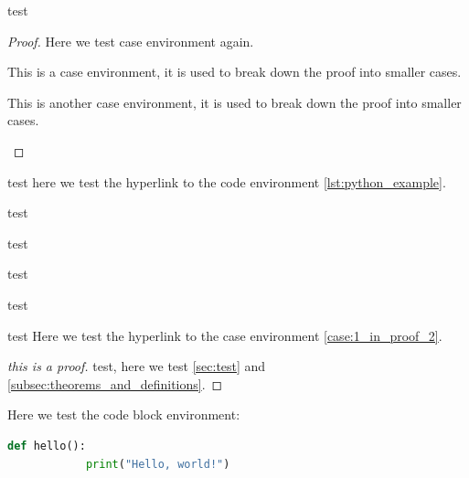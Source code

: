     \begin{lemma}
        test
    \end{lemma}
    \begin{proof}
        Here we test case environment again.
        \begin{case}\label{case:1_in_proof_3} 
            This is a case environment, it is used to break down the proof into smaller cases.
        \end{case}
        \begin{case}\label{case:2_in_proof_3}
            This is another case environment, it is used to break down the proof into smaller cases.
        \end{case}
    \end{proof}

    \begin{corollary}
        test here we test the hyperlink to the code environment \cref{lst:python_example}.
    \end{corollary}
    \begin{question}
        test
    \end{question}
    \begin{conjecture}
        test
    \end{conjecture}

    \begin{example}
        test 
    \end{example}
    \begin{exercise}
        test
    \end{exercise}
    \begin{remark}
        test
        Here we test the hyperlink to the case environment \cref{case:1_in_proof_2}.
    \end{remark}
    \begin{proof}[this is a proof]
        test, here we test \cref{sec:test} and \cref{subsec:theorems_and_definitions}.
    \end{proof}

    Here we test the code block environment:
    \begin{lstlisting}[language=Python, caption=Python code example, label=lst:python_example]
        def hello():
            print("Hello, world!")
    \end{lstlisting}

    


